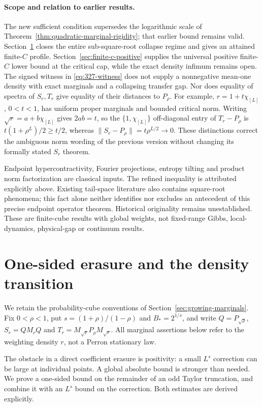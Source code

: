 \documentclass[11pt]{article}
\begin{document}
\paragraph{Scope and relation to earlier results.}
The new sufficient condition supersedes the logarithmic scale of
Theorem~\ref{thm:quadratic-marginal-rigidity}; that earlier bound remains
valid. Section~\ref{sec:one-sided-erasure}
closes the entire sub-square-root collapse regime and gives an attained
finite-$C$ profile. Section~\ref{sec:finite-c-positive} supplies the
universal positive finite-$C$ lower bound at the critical cap, while the
exact density infimum remains open. The signed witness
in \eqref{eq:327-witness} does not supply a nonnegative mean-one density
with exact marginals and a collapsing transfer gap. Nor does equality
of spectra of $S_r,T_r$ give equality of their distances to $P_\rho$.
For example, $r=1+t\chi_{[L]}$, $0<t<1$, has uniform proper marginals
and bounded critical norm. Writing $\sqrt r=a+b\chi_{[L]}$ gives
$2ab=t$, so the $\{1,\chi_{[L]}\}$ off-diagonal entry of
$T_r-P_\rho$ is $t(1+\rho^L)/2\geq t/2$, whereas
$\|S_r-P_\rho\|=t\rho^{L/2}\to0$.
These distinctions correct the ambiguous norm wording of the previous
version without changing its formally stated $S_r$ theorem.

Endpoint hypercontractivity, Fourier projections, entropy tilting and
product norm factorization are classical inputs. The refined inequality
is attributed explicitly above. Existing tail-space literature also
contains square-root phenomena; this fact alone neither identifies nor
excludes an antecedent of this precise endpoint operator theorem.
Historical originality remains unestablished. These are finite-cube
results with global weights, not fixed-range Gibbs, local-dynamics,
physical-gap or continuum results.

\section{One-sided erasure and the density transition}
\label{sec:one-sided-erasure}
We retain the probability-cube conventions of
Section~\ref{sec:growing-marginals}. Fix $0<\rho<1$, put
$s=(1+\rho)/(1-\rho)$ and $B_*=2^{1/s}$, and write
$Q=P_{\sqrt\rho}$, $S_r=QM_rQ$ and
$T_r=M_{\sqrt r}P_\rho M_{\sqrt r}$. All marginal assertions below
refer to the weighting density $r$, not a Perron stationary law.

The obstacle in a direct coefficient erasure is positivity: a small
$L^s$ correction can be large at individual points. A global absolute
bound is stronger than needed. We prove a one-sided bound on the remainder
of an odd Taylor truncation, and combine it with an $L^s$ bound on the
correction. Both estimates are derived explicitly.
\end{document}
